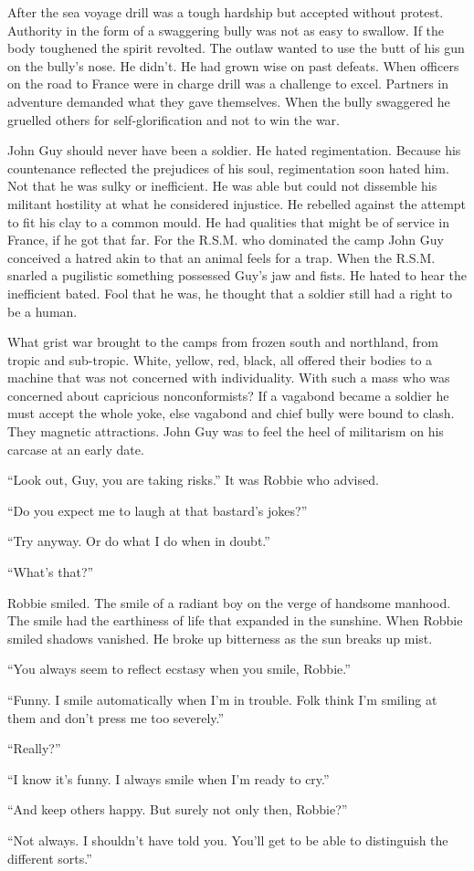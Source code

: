 After the sea voyage drill was a tough hardship but accepted without protest. 
Authority in the form of a swaggering bully was not as easy to swallow. If 
the body toughened the spirit revolted. The outlaw wanted to use the butt of 
his gun on the bully's nose. He didn't. He had grown wise on past defeats. 
When officers on the road to France were in charge drill was a challenge to 
excel. Partners in adventure demanded what they gave themselves. When the 
bully swaggered he gruelled others for self-glorification and not to win the 
war.

John Guy should never have been a soldier. He hated regimentation. Because 
his countenance reflected the prejudices of his soul, regimentation soon 
hated him. Not that he was sulky or inefficient. He was able but could not 
dissemble his militant hostility at what he considered injustice. He rebelled 
against the attempt to fit his clay to a common mould. He had qualities that 
might be of service in France, if he got that far. For the R.S.M. who dominated 
the camp John Guy conceived a hatred akin to that an animal feels for a trap. 
When the R.S.M. snarled a pugilistic something possessed Guy's jaw and fists. 
He hated to hear the inefficient bated. Fool that he was, he thought that a 
soldier still had a right to be a human.

What grist war brought to the camps from frozen south and northland, from tropic 
and sub-tropic. White, yellow, red, black, all offered their bodies to a machine 
that was not concerned with individuality. With such a mass who was concerned 
about capricious nonconformists? If a vagabond became a soldier he must accept 
the whole yoke, else vagabond and chief bully were bound to clash. They magnetic 
attractions. John Guy was to feel the heel of militarism on his carcase at an 
early date.

``Look out, Guy, you are taking risks.'' It was Robbie who advised.

``Do you expect me to laugh at that bastard's jokes?''

``Try anyway. Or do what I do when in doubt.''

``What's that?''

Robbie smiled. The smile of a radiant boy on the verge of handsome manhood. The 
smile had the earthiness of life that expanded in the sunshine. When Robbie smiled 
shadows vanished. He broke up bitterness as the sun breaks up mist.

``You always seem to reflect ecstasy when you smile, Robbie.''

``Funny. I smile automatically when I'm in trouble. Folk think I'm smiling at 
them and don't press me too severely.''

``Really?''

``I know it's funny. I always smile when I'm ready to cry.''

``And keep others happy. But surely not only then, Robbie?''

``Not always. I shouldn't have told you. You'll get to be able to distinguish 
the different sorts.''